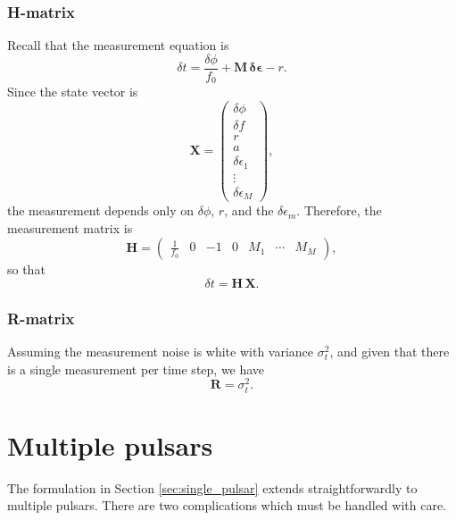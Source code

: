 \documentclass{tufte-handout} %
\begin{document}
\subsubsection{H-matrix}
	Recall that the measurement equation is
		\begin{equation}
	\delta t = \frac{\delta\phi}{f_0} + \boldsymbol{M}\,\boldsymbol{\delta\epsilon} - r.
		\end{equation}
	Since the state vector is
	\begin{equation}
	\boldsymbol{X} = \begin{pmatrix}
		\delta\phi \\ \delta f \\ r \\ a \\ \delta\epsilon_1 \\ \vdots \\ \delta\epsilon_M
	\end{pmatrix},
		\end{equation}
	the measurement depends only on $\delta\phi$, $r$, and the $\delta\epsilon_m$. Therefore, the measurement matrix is
		\begin{equation}
	\boldsymbol{H} = \begin{pmatrix}
		\frac{1}{f_0} & 0 & -1 & 0 & M_1 & \cdots & M_M
	\end{pmatrix},
		\end{equation}
	so that
		\begin{equation}
	\delta t = \boldsymbol{H}\,\boldsymbol{X}.
		\end{equation}
	
\subsubsection{R-matrix}
	Assuming the measurement noise is white with variance $\sigma_t^2$, and given that there is a single measurement per time step, we have
	\begin{equation}
	\boldsymbol{R} = \sigma_t^2.
	\end{equation}

	


\section{Multiple pulsars}

The formulation in Section \ref{sec:single_pulsar} extends straightforwardly to multiple pulsars. There are two complications which must be handled with care.
\end{document}
